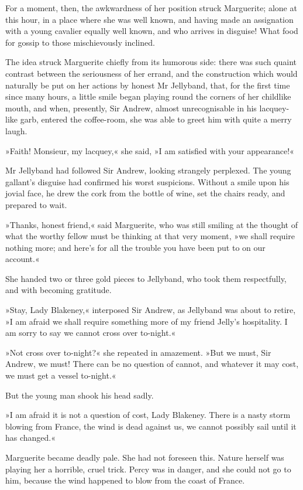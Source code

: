 For a moment, then, the awkwardness of her position struck Marguerite; alone at this hour, in a place where she was well known, and having made an assignation with a young cavalier equally well known, and who arrives in disguise! What food for gossip to those mischievously inclined.

The idea struck Marguerite chiefly from its humorous side: there was such quaint contrast between the seriousness of her errand, and the construction which would naturally be put on her actions by honest Mr Jellyband, that, for the first time since many hours, a little smile began playing round the corners of her childlike mouth, and when, presently, Sir Andrew, almost unrecognisable in his lacquey-like garb, entered the coffee-room, she was able to greet him with quite a merry laugh.

»Faith! Monsieur, my lacquey,« she said, »I am satisfied with your appearance!«

Mr Jellyband had followed Sir Andrew, looking strangely perplexed. The young gallant's disguise had confirmed his worst suspicions. With\-out a smile upon his jovial face, he drew the cork from the bottle of wine, set the chairs ready, and prepared to wait.

»Thanks, honest friend,« said Marguerite, who was still smiling at the thought of what the worthy fellow must be thinking at that very moment, »we shall require nothing more; and here's for all the trouble you have been put to on our account.«

She handed two or three gold pieces to Jellyband, who took them respectfully, and with becoming gratitude.

»Stay, Lady Blakeney,« interposed Sir Andrew, as Jellyband was about to retire, »I am afraid we shall require something more of my friend Jelly's hospitality. I am sorry to say we cannot cross over to-night.«

»Not cross over to-night?« she repeated in amazement. »But we must, Sir Andrew, we must! There can be no question of cannot, and whatever it may cost, we must get a vessel to-night.«

But the young man shook his head sadly.

»I am afraid it is not a question of cost, Lady Blakeney. There is a nasty storm blowing from France, the wind is dead against us, we cannot possibly sail until it has changed.«

Marguerite became deadly pale. She had not foreseen this. Nature herself was playing her a horrible, cruel trick. Percy was in danger, and she could not go to him, because the wind happened to blow from the coast of France.

